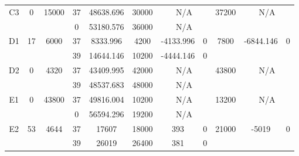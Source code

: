 \begin{sidewaystable}
\begin{tabular}{c||c|c||c|c|c|c|c||c|c|c}
         &
        
      \\
      \hline
      \multirow{2}{*}{C3} &
      \multirow{2}{*}{0} &
      \multirow{2}{*}{15000} &
      37 &
      48638.696 &
      30000 &
        \multicolumn{2}{|c||}{N/A} &
      \multirow{2}{*}{37200} &
        \multicolumn{2}{c}{\multirow{2}{*}{N/A}}
      \\
      \cline{4-8}
       &
       &
       &
      0 &
      53180.576 &
      36000 &
        \multicolumn{2}{|c||}{N/A} &
      
        
      \\
      \hline
      \multirow{2}{*}{D1} &
      \multirow{2}{*}{17} &
      \multirow{2}{*}{6000} &
      37 &
      8333.996 &
      4200 &
        -4133.996 &
        0 &
      \multirow{2}{*}{7800} &
        \multirow{2}{*}{-6844.146} &
        \multirow{2}{*}{0}
      \\
      \cline{4-8}
       &
       &
       &
      39 &
      14644.146 &
      10200 &
        -4444.146 &
        0 &
      
         &
        
      \\
      \hline
      \multirow{2}{*}{D2} &
      \multirow{2}{*}{0} &
      \multirow{2}{*}{4320} &
      37 &
      43409.995 &
      42000 &
        \multicolumn{2}{|c||}{N/A} &
      \multirow{2}{*}{43800} &
        \multicolumn{2}{c}{\multirow{2}{*}{N/A}}
      \\
      \cline{4-8}
       &
       &
       &
      39 &
      48537.683 &
      48000 &
        \multicolumn{2}{|c||}{N/A} &
      
        
      \\
      \hline
      \multirow{2}{*}{E1} &
      \multirow{2}{*}{0} &
      \multirow{2}{*}{43800} &
      37 &
      49816.004 &
      10200 &
        \multicolumn{2}{|c||}{N/A} &
      \multirow{2}{*}{13200} &
        \multicolumn{2}{c}{\multirow{2}{*}{N/A}}
      \\
      \cline{4-8}
       &
       &
       &
      0 &
      56594.296 &
      19200 &
        \multicolumn{2}{|c||}{N/A} &
      
        
      \\
      \hline
      \multirow{2}{*}{E2} &
      \multirow{2}{*}{53} &
      \multirow{2}{*}{4644} &
      37 &
      17607 &
      18000 &
        393 &
        0 &
      \multirow{2}{*}{21000} &
        \multirow{2}{*}{-5019} &
        \multirow{2}{*}{0}
      \\
      \cline{4-8}
       &
       &
       &
      39 &
      26019 &
      26400 &
        381 &
        0 &
      

\end{tabular}
\end{sidewaystable}
